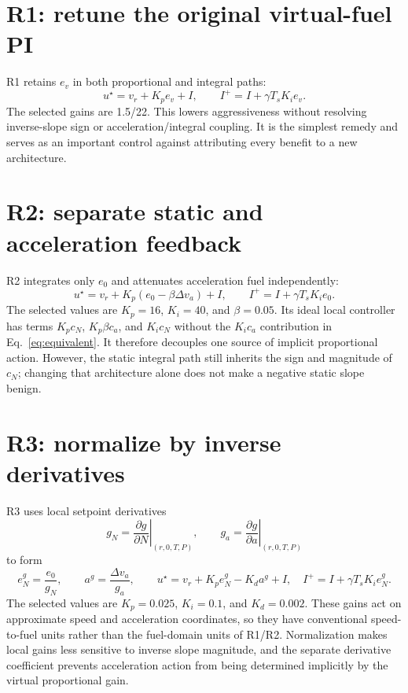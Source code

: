 \section{R1: retune the original virtual-fuel PI}
R1 retains $e_v$ in both proportional and integral paths:
\begin{equation}
u^\star=v_r+K_pe_v+I,\qquad I^+=I+\gamma T_sK_ie_v.
\end{equation}
The selected gains are 1.5/22. This lowers aggressiveness without resolving inverse-slope sign or acceleration/integral coupling. It is the simplest remedy and serves as an important control against attributing every benefit to a new architecture.

\section{R2: separate static and acceleration feedback}
R2 integrates only $e_0$ and attenuates acceleration fuel independently:
\begin{equation}
u^\star=v_r+K_p(e_0-\beta\Delta v_a)+I,\qquad
I^+=I+\gamma T_sK_ie_0.
\end{equation}
The selected values are $K_p=16$, $K_i=40$, and $\beta=0.05$. Its ideal local controller has terms $K_pc_N$, $K_p\beta c_a$, and $K_ic_N$ without the $K_ic_a$ contribution in Eq.~\eqref{eq:equivalent}. It therefore decouples one source of implicit proportional action. However, the static integral path still inherits the sign and magnitude of $c_N$; changing that architecture alone does not make a negative static slope benign.

\section{R3: normalize by inverse derivatives}
R3 uses local setpoint derivatives
\begin{equation}
g_N=\left.\frac{\partial g}{\partial N}\right|_{(r,0,T,P)},\qquad
g_a=\left.\frac{\partial g}{\partial a}\right|_{(r,0,T,P)}
\end{equation}
to form
\begin{equation}
e_N^g=\frac{e_0}{g_N},\qquad a^g=\frac{\Delta v_a}{g_a},\qquad
u^\star=v_r+K_pe_N^g-K_da^g+I,
\quad I^+=I+\gamma T_sK_ie_N^g.
\label{eq:r3}
\end{equation}
The selected values are $K_p=0.025$, $K_i=0.1$, and $K_d=0.002$. These gains act on approximate speed and acceleration coordinates, so they have conventional speed-to-fuel units rather than the fuel-domain units of R1/R2. Normalization makes local gains less sensitive to inverse slope magnitude, and the separate derivative coefficient prevents acceleration action from being determined implicitly by the virtual proportional gain.

